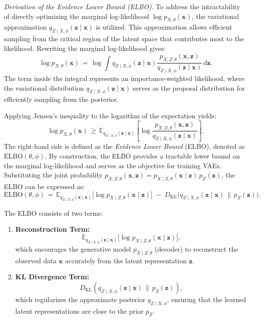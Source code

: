 \textit{Derivation of the Evidence Lower Bound (ELBO).} To address the intractability of directly optimizing the marginal log-likelihood \(\log p_{X,\theta}(\mathbf{x})\), the variational approximation \(q_{Z\mid X,\phi}(\mathbf{z} \mid \mathbf{x})\) is utilized. This approximation allows efficient sampling from the critical region of the latent space that contributes most to the likelihood. Rewriting the marginal log-likelihood gives:
\[
\log p_{X,\theta}(\mathbf{x}) 
\,=\,
\log 
\int 
q_{Z \mid X,\phi}(\mathbf{z} \mid \mathbf{x}) 
\frac{p_{X,Z,\theta}(\mathbf{x}, \mathbf{z})}{q_{Z \mid X,\phi}(\mathbf{z} \mid \mathbf{x})}
\, d\mathbf{z}.
\]
The term inside the integral represents an importance-weighted likelihood, where the variational distribution \(q_{Z \mid X,\phi}(\mathbf{z} \mid \mathbf{x})\) serves as the proposal distribution for efficiently sampling from the posterior. 

Applying Jensen's inequality to the logarithm of the expectation yields:
\[
\log p_{X,\theta}(\mathbf{x}) 
\,\geq\,
\mathbb{E}_{q_{Z \mid X,\phi}(\mathbf{z} \mid \mathbf{x})} 
\left[
\log \frac{p_{X,Z,\theta}(\mathbf{x}, \mathbf{z})}{q_{Z \mid X,\phi}(\mathbf{z} \mid \mathbf{x})}
\right].
\]
The right-hand side is defined as the \emph{Evidence Lower Bound} (ELBO), denoted as \(\mathrm{ELBO}(\theta, \phi)\). By construction, the ELBO provides a tractable lower bound on the marginal log-likelihood and serves as the objective for training VAEs. Substituting the joint probability \(p_{X,Z,\theta}(\mathbf{x}, \mathbf{z}) = p_{X \mid Z,\theta}(\mathbf{x} \mid \mathbf{z}) \, p_Z(\mathbf{z})\), the ELBO can be expressed as:
\[
\mathrm{ELBO}(\theta, \phi) 
\,=\,
\mathbb{E}_{q_{Z \mid X,\phi}(\mathbf{z} \mid \mathbf{x})}
\big[
\log p_{X \mid Z,\theta}(\mathbf{x} \mid \mathbf{z})
\big]
\;-\;
D_{\mathrm{KL}}
\big(q_{Z \mid X,\phi}(\mathbf{z} \mid \mathbf{x}) \,\|\, p_Z(\mathbf{z})\big).
\]

\noindent The ELBO consists of two terms:
\begin{enumerate}
    \item \textbf{Reconstruction Term:}  
    \[
    \mathbb{E}_{q_{Z \mid X,\phi}(\mathbf{z} \mid \mathbf{x})} 
    \big[\log p_{X \mid Z,\theta}(\mathbf{x} \mid \mathbf{z})\big],
    \]
    which encourages the generative model \(p_{X \mid Z,\theta}\) (decoder) to reconstruct the observed data \(\mathbf{x}\) accurately from the latent representation \(\mathbf{z}\).
    \item \textbf{KL Divergence Term:}  
    \[
    D_{\mathrm{KL}}(q_{Z \mid X,\phi}(\mathbf{z} \mid \mathbf{x}) \,\|\, p_Z(\mathbf{z})),
    \]
    which regularizes the approximate posterior \(q_{Z \mid X,\phi}\), ensuring that the learned latent representations are close to the prior \(p_Z\).
\end{enumerate}

